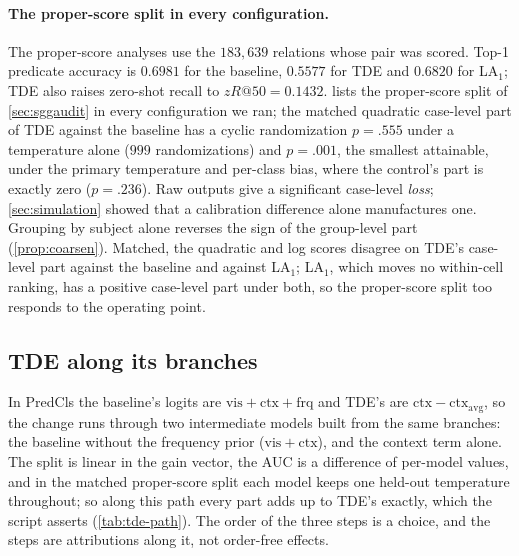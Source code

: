 \paragraph{The proper-score split in every configuration.} The proper-score analyses use
the $183{,}639$ relations whose pair was scored. Top-1 predicate accuracy is $0.6981$ for
the baseline, $0.5577$ for TDE and $0.6820$ for LA$_1$; TDE also raises zero-shot recall to
$zR@50=0.1432$.  lists the proper-score split of
\cref{sec:sggaudit} in every configuration we ran; the matched quadratic case-level part
of TDE against the baseline has a cyclic randomization $p=.555$ under a temperature alone
($999$ randomizations) and $p=.001$, the smallest attainable, under the primary temperature
and per-class bias, where the control's part is exactly zero ($p=.236$). Raw outputs
give a significant case-level \emph{loss}; \cref{sec:simulation} showed that a calibration
difference alone manufactures one. Grouping by subject alone reverses the sign of the
group-level part (\cref{prop:coarsen}). Matched, the quadratic and log scores disagree on
TDE's case-level part against the baseline and against LA$_1$; LA$_1$, which moves no
within-cell ranking, has a positive case-level part under both, so the proper-score split
too responds to the operating point.

\begin{table}[t]
\centering\footnotesize
\caption{Proper-score split of TDE and of the logit-adjusted baseline (LA), every
configuration. Matched rows fit each model's temperature on a random half of the images and
audit the other half.}
\label{tab:proper-configs}

\end{table}

\subsection{TDE along its branches}\label{app:tdepath}

In PredCls the baseline's logits are $\mathrm{vis}+\mathrm{ctx}+\mathrm{frq}$ and TDE's are
$\mathrm{ctx}-\mathrm{ctx}_{\mathrm{avg}}$, so the change runs through two intermediate models
built from the same branches: the baseline without the frequency prior
($\mathrm{vis}+\mathrm{ctx}$), and the context term alone. The split is linear in the gain
vector, the AUC is a difference of per-model values, and in the matched proper-score split
each model keeps one held-out temperature throughout; so along this path every part adds up
to TDE's exactly, which the script asserts (\cref{tab:tde-path}). The order of the three
steps is a choice, and the steps are attributions along it, not order-free effects.

